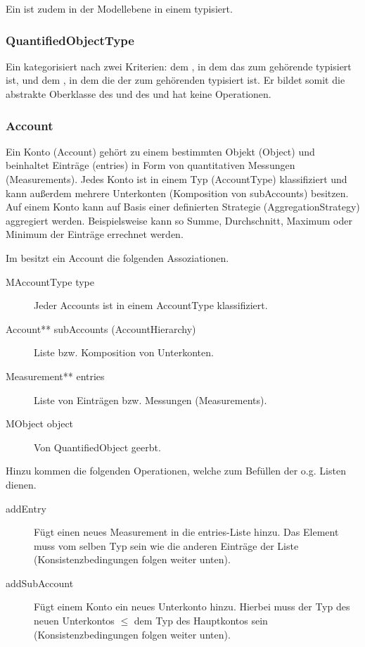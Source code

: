 Ein  ist zudem in der Modellebene in einem  typisiert.


\subsubsection{QuantifiedObjectType}
Ein  kategorisiert  nach zwei Kriterien: dem , in dem das
zum  gehörende  typisiert ist, und dem , in dem die 
der zum  gehörenden  typisiert ist. Er bildet somit die abstrakte Oberklasse des
 und des  und hat keine Operationen.


\subsubsection{Account}
Ein Konto (Account) gehört zu einem bestimmten Objekt (Object) und beinhaltet Einträge (entries) in Form von quantitativen Messungen (Measurements). 
Jedes Konto ist in einem Typ (AccountType) klassifiziert und kann außerdem mehrere Unterkonten (Komposition von subAccounts) besitzen.
Auf einem Konto kann auf Basis einer definierten Strategie (AggregationStrategy) aggregiert werden. 
Beispielsweise kann so Summe, Durchschnitt, Maximum oder Minimum der Einträge errechnet werden. 

Im \MM besitzt ein Account die folgenden Assoziationen.
\begin{description}
	\item[MAccountType type] Jeder Accounts ist in einem AccountType klassifiziert.
	\item[Account** subAccounts (AccountHierarchy)] Liste bzw. Komposition von Unterkonten.
	\item[Measurement** entries] Liste von Einträgen bzw. Messungen (Measurements).
	\item[MObject object] Von QuantifiedObject geerbt.
\end{description}

Hinzu kommen die folgenden Operationen, welche zum Befüllen der o.g. Listen dienen.
\begin{description}
	\item[addEntry] Fügt einen neues Measurement in die entries-Liste hinzu. Das Element muss vom selben Typ sein wie die anderen Einträge der Liste (Konsistenzbedingungen folgen weiter unten).  
	\item[addSubAccount] Fügt einem Konto ein neues Unterkonto hinzu. Hierbei muss der Typ des neuen Unterkontos $\leq$ dem Typ des Hauptkontos sein (Konsistenzbedingungen folgen weiter unten).
\end{description}


